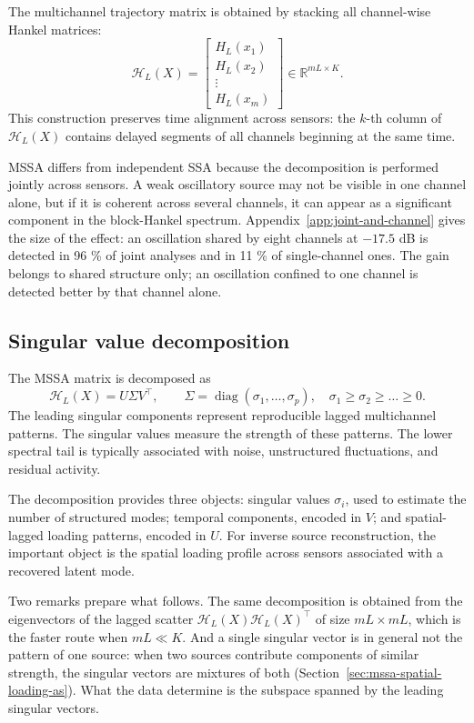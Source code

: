 \documentclass{article}
\begin{document}
The multichannel trajectory matrix is obtained by stacking all channel-wise Hankel matrices: \[
\mathcal{H}_L(X) =
\begin{bmatrix}
H_L(x_1) \\ H_L(x_2) \\ \vdots \\ H_L(x_m)
\end{bmatrix}
\in \mathbb{R}^{mL \times K}.
\] This construction preserves time alignment across sensors: the $k$-th column of $\mathcal{H}_L(X)$ contains delayed segments of all channels beginning at the same time.

MSSA differs from independent SSA because the decomposition is performed jointly across sensors. A weak oscillatory source may not be visible in one channel alone, but if it is coherent across several channels, it can appear as a significant component in the block-Hankel spectrum. Appendix~\ref{app:joint-and-channel} gives the size of the effect: an oscillation shared by eight channels at $-17.5$ dB is detected in 96 \% of joint analyses and in 11 \% of single-channel ones. The gain belongs to shared structure only; an oscillation confined to one channel is detected better by that channel alone.

\subsection{Singular value decomposition}\label{sec:singular-value-decomposition}

The MSSA matrix is decomposed as \[
\mathcal{H}_L(X) = U \Sigma V^{\top}, \qquad \Sigma = \operatorname{diag}(\sigma_1, \dots, \sigma_p), \quad \sigma_1 \ge \sigma_2 \ge \dots \ge 0 .
\] The leading singular components represent reproducible lagged multichannel patterns. The singular values measure the strength of these patterns. The lower spectral tail is typically associated with noise, unstructured fluctuations, and residual activity.

The decomposition provides three objects: singular values $\sigma_i$, used to estimate the number of structured modes; temporal components, encoded in $V$; and spatial-lagged loading patterns, encoded in $U$. For inverse source reconstruction, the important object is the spatial loading profile across sensors associated with a recovered latent mode.

Two remarks prepare what follows. The same decomposition is obtained from the eigenvectors of the lagged scatter $\mathcal{H}_L(X)\mathcal{H}_L(X)^{\top}$ of size $mL \times mL$, which is the faster route when $mL \ll K$. And a single singular vector is in general not the pattern of one source: when two sources contribute components of similar strength, the singular vectors are mixtures of both (Section~\ref{sec:mssa-spatial-loading-as}). What the data determine is the subspace spanned by the leading singular vectors.
\end{document}
